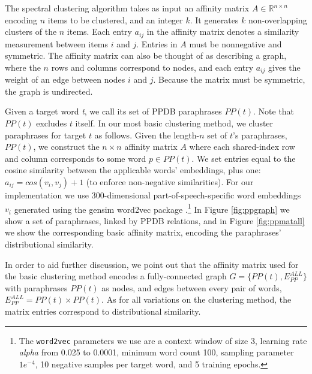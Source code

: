 \documentclass[11pt]{article}
\begin{document}
The spectral clustering algorithm \cite{yu2003multiclass} takes as input an affinity matrix $A \in \mathbb{R}^{n\times n}$ encoding $n$ items to be clustered, and an integer $k$. It generates $k$ non-overlapping clusters of the $n$ items. Each entry $a_{ij}$ in the affinity matrix denotes a similarity measurement between items $i$ and $j$. Entries in $A$ must be nonnegative and symmetric. The affinity matrix can also be thought of as describing a graph, where the $n$ rows and columns correspond to nodes, and each entry $a_{ij}$ gives the weight of an edge between nodes $i$ and $j$. Because the matrix must be symmetric, the graph is undirected.

Given a target word \textit{t}, we call its set of PPDB paraphrases $PP(t)$. Note that $PP(t)$ excludes $t$ itself. In our most basic clustering method, we cluster paraphrases for target $t$ as follows. Given the length-$n$ set of $t$'s paraphrases, $PP(t)$, we construct the $n \times n$ affinity matrix $A$ where each shared-index row and column corresponds to some word $p \in PP(t)$. We set entries equal to the cosine similarity between the applicable words' embeddings, plus one: $a_{ij} = cos(v_i,v_j) + 1$ (to enforce non-negative similarities). For our implementation we use 300-dimensional part-of-speech-specific word embeddings $v_i$ generated using the gensim word2vec package \cite{mikolov2013distributed,mikolov2013efficient,ismu:884893}.\footnote{The \texttt{word2vec} parameters we use are a context window of size 3, learning rate \textit{alpha} from 0.025 to 0.0001, minimum word count 100, sampling parameter $1e^{-4}$, 10 negative samples per target word, and 5 training epochs.} In Figure \ref{fig:ppgraph} we show a set of paraphrases, linked by PPDB relations, and in Figure \ref{fig:ppmatall} we show the corresponding basic affinity matrix, encoding the paraphrases' distributional similarity.

In order to aid further discussion, we point out that the affinity matrix used for the basic clustering method encodes a fully-connected graph $G = \{PP(t), E_{PP}^{ALL}\}$ with paraphrases $PP(t)$ as nodes, and edges between every pair of words, $E_{PP}^{ALL} = PP(t) \times PP(t)$. As for all variations on the clustering method, the matrix entries correspond to distributional similarity.
\end{document}
